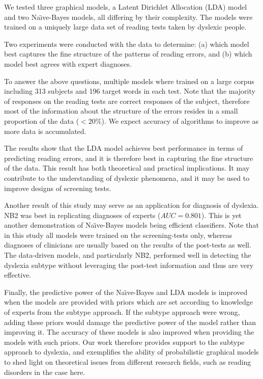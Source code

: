 {{{We tested three graphical models, a Latent Dirichlet Allocation (LDA) model and two Na\"{\i}ve-Bayes models, all differing by their complexity. The models were trained on a uniquely large data set of reading tests taken by dyslexic people.

Two experiments were conducted with the data to determine: (a) which model best captures the fine structure of the patterns of reading errors, and (b) which model best agrees with expert diagnoses. 

To answer the above questions, multiple models where train\-ed on a large corpus including 313 subjects and 196 target words in each test. Note that the majority of responses on the reading tests are correct responses of the subject, therefore most of the information about the structure of the errors resides in a small proportion of the data ($<20\%$). We expect accuracy of algorithms to improve as more data is accumulated.

The results show that the LDA model achieves best performance in terms of predicting reading errors, and it is therefore best in capturing the fine structure of the data. This result has both theoretical and practical implications. It may contribute to the understanding of dyslexic phenomena, and it may be used to improve designs of screening tests.

Another result of this study may serve as an application for diagnosis of dyslexia. NB2 was best in replicating diagnoses of experts ($AUC = 0.801$). This is yet another demonstration of Na\"{\i}ve-Bayes models being efficient classifiers. Note that in this study all models were trained on the screening-tests only, whereas diagnoses of clinicians are usually based on the results of the post-tests as well. The data-driven models, and particularly NB2, performed well in detecting the dyslexia subtype without leveraging the post-test information and thus are very effective.

Finally, the predictive power of the Na\"{\i}ve-Bayes and LDA models is improved when the models are provided with priors which are set according to knowledge of experts from the subtype approach. If the subtype approach were wrong, adding these priors would damage the predictive power of the model rather than improving it. The accuracy of these models is also improved when providing the models with such priors. Our work therefore provides support to the subtype approach to dyslexia, and exemplifies the ability of probabilistic graphical models to shed light on theoretical issues from different research fields, such as reading disorders in the case here.

}}}
